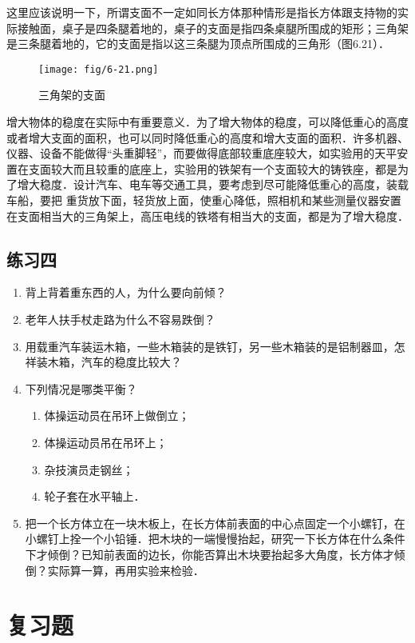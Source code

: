 这里应该说明一下，所谓支面不一定如同长方体那种情形是指长方体跟支持物的实际接触面，桌子是四条腿着地的，桌子的支面是指四条桌腿所围成的矩形；三角架是三条腿着地的，它的支面是指以这三条腿为顶点所围成的三角形（图6.21）．
\begin{figure}[htp]
\centering\texttt{[image: fig/6-21.png]}
\caption{三角架的支面}
\end{figure}

增大物体的稳度在实际中有重要意义．为了增大物体的稳度，可以降低重心的高度或者增大支面的面积，也可以同时降低重心的高度和增大支面的面积．许多机器、仪器、设备不能做得“头重脚轻”，而要做得底部较重底座较大，如实验用的天平安置在支面较大而且较重的底座上，实验用的铁架有一个支面较大的铸铁座，都是为了增大稳度．设计汽车、电车等交通工具，要考虑到尽可能降低重心的高度，装载车船，要把
重货放下面，轻货放上面，使重心降低，照相机和某些测量仪器安置在支面相当大的三角架上，高压电线的铁塔有相当大的支面，都是为了增大稳度．

\subsection*{练习四}
\begin{enumerate}
    \item 背上背着重东西的人，为什么要向前倾？
    \item 老年人扶手杖走路为什么不容易跌倒？
    \item 用载重汽车装运木箱，一些木箱装的是铁钉，另一些木箱装的是铝制器皿，怎祥装木箱，汽车的稳度比较大？
    \item 下列情况是哪类平衡？
    \begin{enumerate}
        \item 体操运动员在吊环上做倒立；
        \item 体操运动员吊在吊环上；
        \item 杂技演员走钢丝；
        \item 轮子套在水平轴上．
    \end{enumerate}
    \item 把一个长方体立在一块木板上，在长方体前表面的中心点固定一个小螺钉，在小螺钉上拴一个小铅锤．把木块的一端慢慢抬起，研究一下长方体在什么条件下才倾倒？已知前表面的边长，你能否算出木块要抬起多大角度，长方体才倾倒？实际算一算，再用实验来检验．
\end{enumerate}

\section*{复习题}

